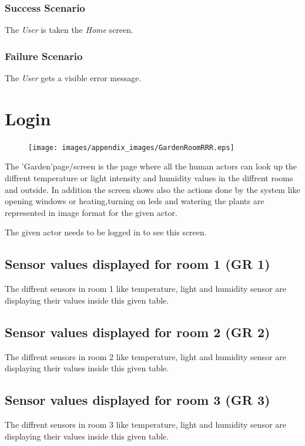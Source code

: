 \subsubsection{Success Scenario}
The \emph{User} is taken the \emph{Home} screen.

\subsubsection{Failure Scenario}
The \emph{User} gets a visible error message.


\section{Login}
\label{sec:appendix_SignIn}
\begin{figure}
\texttt{[image: images/appendix\_images/GardenRoomRRR.eps]}
\end{figure}

The 'Garden'page/screen is the page where all the human actors can look up the
diffrent temperature or light intensity and humidity values in the diffrent
rooms and outside. In addition the screen shows also the actions done by the
system like opening windows or heating,turning on leds and watering the plants
are represented in image format for the given actor.

The given actor needs to be logged in to see this screen.
 
\subsection{Sensor values displayed for room 1 (GR 1)}
The diffrent sensors in room 1 like temperature, light and humidity sensor are
displaying their values inside this given table.

\subsection{Sensor values displayed for room 2 (GR 2)}
The diffrent sensors in room 2 like temperature, light and humidity sensor are
displaying their values inside this given table.

\subsection{Sensor values displayed for room 3 (GR 3)}
The diffrent sensors in room 3 like temperature, light and humidity sensor are
displaying their values inside this given table.

